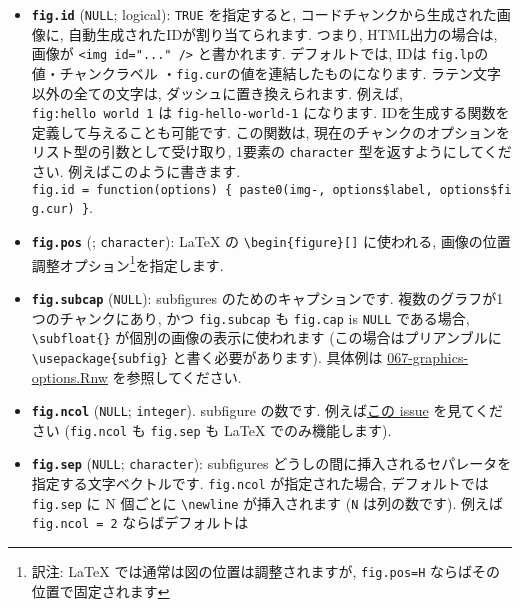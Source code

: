 \documentclass[
  lualatex,ja=standard,jafont=noto-otf]{bxjsreport}
\begin{document}
\begin{itemize}
\item
  \textbf{\texttt{fig.id}} (\texttt{NULL}; logical): \texttt{TRUE}
  を指定すると, コードチャンクから生成された画像に,
  自動生成されたIDが割り当てられます. つまり, HTML出力の場合は, 画像が
  \texttt{\textless{}img\ id="..."\ /\textgreater{}} と書かれます.
  デフォルトでは, IDは \texttt{fig.lp}の値・チャンクラベル
  ・\texttt{fig.cur}の値を連結したものになります.
  ラテン文字以外の全ての文字は, ダッシュに置き換えられます. 例えば,
  \texttt{\textquotesingle{}fig:hello\ world\ 1\textquotesingle{}} は
  \texttt{\textquotesingle{}fig-hello-world-1\textquotesingle{}}
  になります. IDを生成する関数を定義して与えることも可能です.
  この関数は, 現在のチャンクのオプションをリスト型の引数として受け取り,
  1要素の \texttt{character} 型を返すようにしてください.
  例えばこのように書きます.
  \texttt{fig.id\ =\ function(options)\ \{\ paste0(\textquotesingle{}img-\textquotesingle{},\ options\$label,\ options\$fig.cur)\ \}}.
\item
  \textbf{\texttt{fig.pos}}
  (\texttt{\textquotesingle{}\textquotesingle{}}; \texttt{character}):
  LaTeX の \texttt{\textbackslash{}begin\{figure\}{[}{]}} に使われる,
  画像の位置調整オプション\footnote{訳注: LaTeX
    では通常は図の位置は調整されますが,
    \texttt{fig.pos=\textquotesingle{}H\textquotesingle{}}
    ならばその位置で固定されます}を指定します.
\item
  \textbf{\texttt{fig.subcap}} (\texttt{NULL}): subfigures
  のためのキャプションです. 複数のグラフが1つのチャンクにあり, かつ
  \texttt{fig.subcap} も \texttt{fig.cap} is \texttt{NULL} である場合,
  \texttt{\textbackslash{}subfloat\{\}} が個別の画像の表示に使われます
  (この場合はプリアンブルに
  \texttt{\textbackslash{}usepackage\{subfig\}} と書く必要があります).
  具体例は
  \href{https://github.com/yihui/knitr-examples/blob/master/067-graphics-options.Rnw}{067-graphics-options.Rnw}
  を参照してください.
\item
  \textbf{\texttt{fig.ncol}} (\texttt{NULL}; \texttt{integer}).
  subfigure の数です.
  例えば\href{https://github.com/yihui/knitr/issues/1327\#issuecomment-346242532}{この
  issue} を見てください (\texttt{fig.ncol} も \texttt{fig.sep} も LaTeX
  でのみ機能します).
\item
  \textbf{\texttt{fig.sep}} (\texttt{NULL}; \texttt{character}):
  subfigures どうしの間に挿入されるセパレータを指定する文字ベクトルです.
  \texttt{fig.ncol} が指定された場合, デフォルトでは \texttt{fig.sep} に
  N 個ごとに \texttt{\textbackslash{}newline} が挿入されます (\texttt{N}
  は列の数です). 例えば \texttt{fig.ncol\ =\ 2} ならばデフォルトは

\end{itemize}
\end{document}
